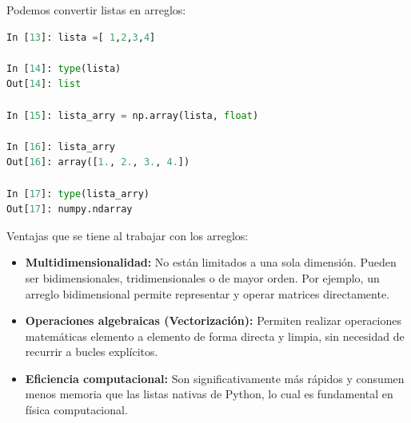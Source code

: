 \documentclass[12pt]{article}
\begin{document}
Podemos convertir listas en arreglos:
%
\begin{lstlisting}[language=Python]
In [13]: lista =[ 1,2,3,4]

In [14]: type(lista)
Out[14]: list

In [15]: lista_arry = np.array(lista, float)

In [16]: lista_arry
Out[16]: array([1., 2., 3., 4.])

In [17]: type(lista_arry)
Out[17]: numpy.ndarray
\end{lstlisting}
Ventajas que se tiene al trabajar con los arreglos:
\begin{itemize}
    \item \textbf{Multidimensionalidad:} No están limitados a una sola dimensión. Pueden ser 
    bidimensionales, tridimensionales o de mayor orden. 
    Por ejemplo, un arreglo bidimensional permite representar y operar matrices directamente.
    \item \textbf{Operaciones algebraicas (Vectorización):} Permiten realizar operaciones 
    matemáticas elemento a elemento de forma directa y limpia, sin necesidad de recurrir a 
    bucles explícitos.
    \item \textbf{Eficiencia computacional:} Son significativamente más rápidos y consumen 
    menos memoria que las listas nativas de Python, lo cual es fundamental en física computacional.
\end{itemize}
\end{document}
